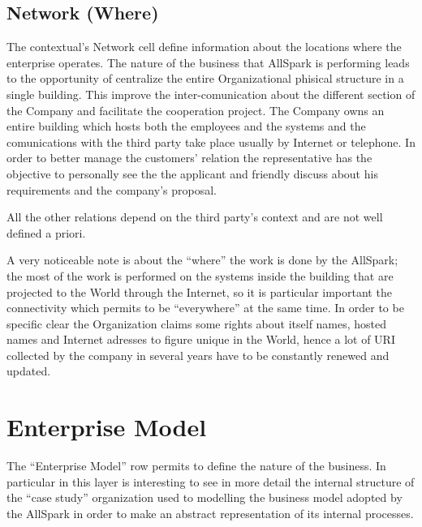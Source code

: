 \subsection{Network (Where)}
\label{subsec:scope[Network]}
The contextual's Network cell define information about the locations where the enterprise operates. The nature of the business that AllSpark is performing leads to the opportunity of centralize the entire Organizational phisical structure in a single building. This improve the inter-comunication about the different section of the Company and facilitate the cooperation project. The Company owns an entire building which hosts both the employees and the systems and the comunications with the third party take place usually by Internet or telephone. In order to better manage the customers' relation the representative has the objective to personally see the the applicant and friendly discuss about his requirements and the company's proposal.


All the other relations depend on the third party's context and are not well defined a priori.


A very noticeable note is about the ``where'' the work is done by the AllSpark; the most of the work is performed on the systems inside the building that are projected to the World through the Internet, so it is particular important the connectivity which permits to be ``everywhere'' at the same time. In order to be specific clear the Organization claims some rights about itself names, hosted names and Internet adresses to figure unique in the World, hence a lot of URI collected by the company in several years have to be constantly renewed and updated.


\section{Enterprise Model}
\label{sec:Enterprise}
The ``Enterprise Model'' row permits to define the nature of the business. In particular in this layer is interesting to see in more detail the internal structure of the ``case study'' organization used to modelling the business model adopted by the AllSpark in order to make an abstract representation of its internal processes.

